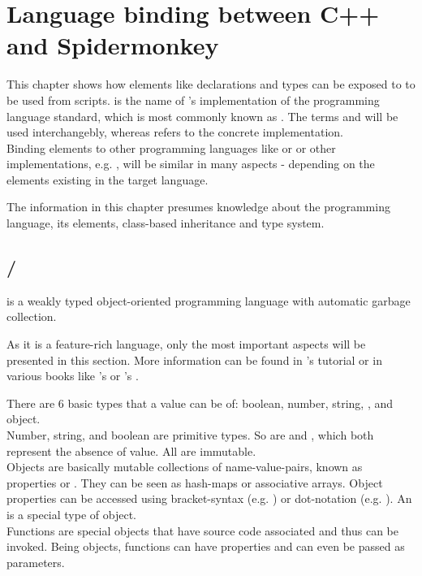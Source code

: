 \chapter{Language binding between C++ and Spidermonkey}
\label{chap:LanguageBindingCPPJS}

This chapter shows how  elements like declarations and types can be exposed to  to be used from scripts.  is the name of 's implementation of the  programming language standard, which is most commonly known as . The terms  and  will be used interchangebly, whereas  refers to the concrete  implementation.\\
Binding  elements to other programming languages like  or  or other  implementations, e.g. , will be similar in many aspects - depending on the elements existing in the target language.

The information in this chapter presumes knowledge about the  programming language, its elements, class-based inheritance and type system.

\section{/}

 is a weakly typed object-oriented programming language with automatic garbage collection. 

As it is a feature-rich language, only the most important aspects will be presented in this section. More information can be found in 's  tutorial or in various books like 's  or 's .

There are 6 basic types that a value can be of: boolean, number, string, ,  and object.\\
Number, string, and boolean are primitive types. So are  and , which both represent the absence of value. All are immutable.\\
Objects are basically mutable collections of name-value-pairs, known as properties or . They can be seen as hash-maps or associative arrays. Object properties can be accessed using bracket-syntax (e.g. ) or dot-notation (e.g. ). An  is a special type of  object.\\
Functions are special objects that have source code associated and thus can be invoked. Being objects, functions can have properties and can even be passed as parameters.

